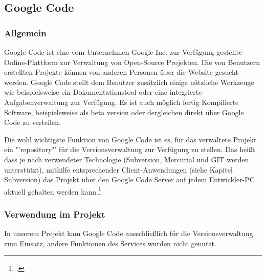\subsection{Google Code}
\subsubsection{Allgemein}
Google Code ist eine vom Unternehmen Google Inc. zur Verfügung gestellte Online-Plattform zur Verwaltung von Open-Source Projekten. Die von Benutzern erstellten Projekte können von anderen Personen über die Website gesucht werden. 
Google Code stellt dem Benutzer zusätzlich einige nützliche Werkzeuge wie beispielsweise ein Dokumentationstool oder eine integrierte Aufgabenverwaltung zur Verfügung. Es ist auch möglich fertig Kompilierte Software, beispielsweise als beta version oder dergleichen direkt über Google Code zu verteilen. 

Die wohl wichtigste Funktion von Google Code ist es, für das verwaltete Projekt ein "'repository"' für die Versionsverwaltung zur Verfügung zu stellen. Das heißt dass je nach verwendeter Technologie (Subversion, Mercurial und GIT werden unterstützt), mithilfe entsprechender Client-Anwendungen (siehe Kapitel Subversion) das Projekt über den Google Code Server auf jedem Entwickler-PC aktuell gehalten werden kann.\footcite[vgl.][]{googlecode}

\subsubsection{Verwendung im Projekt}
In unserem Projekt kam Google Code ausschließlich für die Versionsverwaltung zum Einsatz, andere Funktionen des Services wurden nicht genutzt. 

